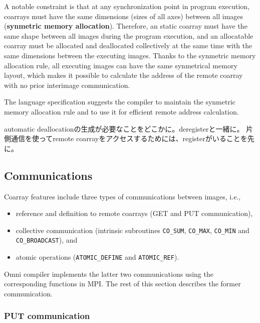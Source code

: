 A notable constraint is that at any synchronization point in program execution, 
coarrays must have the same dimensions (sizes of all axes) between all images
({\bf synmetric memory allocation}). 
Therefore, an static coarray must have the same shape between all images during 
the program execution, and an allocatable coarray must be allocated and deallocated 
collectively at the same time with the same dimensions between the executing images.
Thanks to the synmetric memory allocation rule, all executing images can have
the same synmetrical memory layout, which makes it possible to calculate the address 
of the remote coarray with no prior interimage communication.

\requirement
The language specification suggests the compiler to maintain the synmetric memory
allocation rule and to use it for efficient remote address calculation.


automatic deallocationの生成が必要なことをどこかに。deregisterと一緒に。
片側通信を使ってremote coarrayをアクセスするためには、registerがいることを先に。


\subsection{Communications}

Coarray features include three types of communications between images, i.e.,
\begin{itemize}
\item reference and definition to remote coarrays (GET and PUT communication),
\item collective communication (intrinsic subroutines {\tt CO\_SUM}, {\tt CO\_MAX}, 
{\tt CO\_MIN} and {\tt CO\_BROADCAST}), and
\item atomic operations ({\tt ATOMIC\_DEFINE} and {\tt ATOMIC\_REF}).
\end{itemize}

Omni compiler implements the latter two communications using the corresponding 
functions in MPI. The rest of this section describes the former communication.

\subsubsection{PUT communication}\label{sec:PUT}

